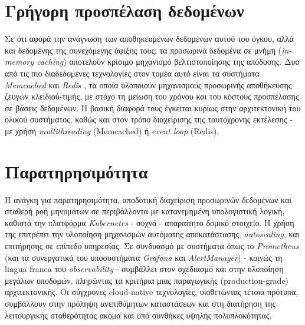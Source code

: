 \section{Γρήγορη προσπέλαση δεδομένων}

Σε ότι αφορά την ανάγνωση των αποθηκευμένων δεδομένων αυτού του όγκου, αλλά και δεδομένης της συνεχόμενης άφιξης τους, τα προσωρινά δεδομένα σε μνήμη (\textit{in-memory caching}) αποτελούν κρίσιμο μηχανισμό βελτιστοποίησης της απόδοσης. Δυο από τις πιο διαδεδομένες τεχνολογίες στον τομέα αυτό είναι τα συστήματα \textit{Memcached} \cite{memcachedfb} και \textit{Redis} \cite{redisia}, τα οποία υλοποιούν μηχανισμούς προσωρινής αποθήκευσης ζευγών κλειδιού-τιμής, με στόχο τη μείωση του χρόνου και του κόστους προσπέλασης σε βάσεις δεδομένων. Η βασική διαφορά τους έγκειται κυρίως στην αρχιτεκτονική του ολικού συστήματος, καθώς και στον τρόπο διαχείρισης της ταυτόχρονης εκτέλεσης - με χρήση \textit{multithreading} (Memcached) ή \textit{event loop} (Redis).

\section{Παρατηρησιμότητα}

Η ανάγκη για παρατηρησιμότητα, αποδοτική διαχείριση προσωρινών δεδομένων και σταθερή ροή μηνυμάτων σε περιβάλλοντα με κατανεμημένη υπολογιστική λογική, καθιστά την πλατφόρμα \textit{Kubernetes} - συχνά -  απαραίτητο δομικό στοιχείο. Η χρήση της επιτρέπει την υλοποίηση μηχανισμών αυτόματης αποκατάστασης, \textit{autoscaling}, και επιτήρησης σε επίπεδο υπηρεσίας. Σε συνδυασμό με συστήματα όπως το \textit{Prometheus} (και τα συνεργατικά του υποσυστήματα \textit{Grafana} και \textit{AlertManager}) \cite{inframon} - κοινώς τη lingua franca του \textit{observability} - συμβάλλει στον σχεδιασμό και στην υλοποίηση μεγάλων υποδομών, πληρώντας τα κριτήρια μιας παραγωγικής (production-grade) αρχιτεκτονικής. Οι σύγχρονες cloud-native τεχνολογίες, υιοθετώντας τέτοια πρότυπα, συμβάλλουν στην πρόληψη ανεπιθύμητων καταστάσεων και στη διατήρηση της λειτουργικής σταθερότητας ακόμα και υπό συνθήκες υψηλής πολυπλοκότητας.
